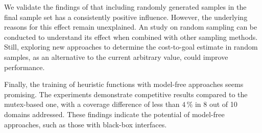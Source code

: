 We validate the findings of \citet{otoole2022sampling} that including randomly generated samples in the final sample set has a consistently positive influence. However, the underlying reasons for this effect remain unexplained. An study on random sampling can be conducted to understand its effect when combined with other sampling methods. Still, exploring new approaches to determine the cost-to-goal estimate in random samples, as an alternative to the current arbitrary value, could improve performance.

Finally, the training of heuristic functions with model-free approaches seems promising. The experiments demonstrate competitive results compared to the mutex-based one, with a coverage difference of less than $4\,\%$ in 8 out of 10 domains addressed. These findings indicate the potential of model-free approaches, such as those with black-box interfaces.
